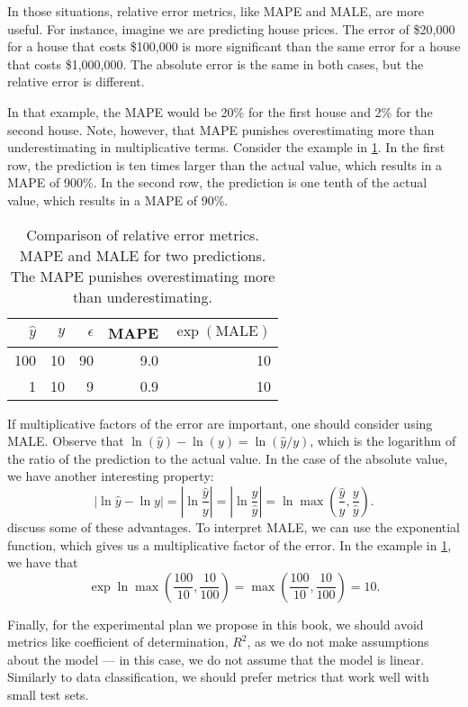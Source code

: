 In those situations, relative error metrics, like MAPE and MALE, are more useful.  For
instance, imagine we are predicting house prices.  The error of \$20,000
for a house that costs \$100,000 is more significant than the same error for a house that
costs \$1,000,000.  The absolute error is the same in both cases, but the relative error
is different.

In that example, the MAPE would be 20\% for the first house and 2\% for the second house.
Note, however, that MAPE punishes overestimating more than underestimating in
multiplicative terms.  Consider the example in \cref{tab:MAPEvsMALE}.  In the first row,
the prediction is ten times larger than the actual value, which results in a MAPE of
900\%.  In the second row, the prediction is one tenth of the actual value, which results
in a MAPE of 90\%.

\begin{table}
  \caption{
    Comparison of relative error metrics.  MAPE and MALE for two predictions.  The MAPE
    punishes overestimating more than underestimating.
  }
  \label{tab:MAPEvsMALE}
  \centering
  \begin{tabular}{r r r r r}
    \toprule
    $\hat{y}$ & $y$ & $\epsilon$ & MAPE & $\exp(\text{MALE})$ \\
    \midrule
    100 & 10 & 90 & 9.0 & 10 \\
      1 & 10 &  9 & 0.9 & 10 \\
    \bottomrule
  \end{tabular}
\end{table}

If multiplicative factors of the error are important, one should consider using MALE.
Observe that $\ln(\hat{y}) - \ln(y) = \ln(\hat{y}/y)$, which is the logarithm of the
ratio of the prediction to the actual value.  In the case of the absolute value, we have
another interesting property: \[
  |\ln\hat{y} - \ln y| =
    |\ln\frac{\hat{y}}{y}| =
    |\ln\frac{y}{\hat{y}}| =
    \ln\max\left(\frac{\hat{y}}{y}, \frac{y}{\hat{y}}\right)\text{.}
\]
\textcite{Tofallis2015} discuss some of these advantages.  To
interpret MALE, we can use the exponential function, which gives us a multiplicative
factor of the error.  In the example in \cref{tab:MAPEvsMALE}, we have that \[
  \exp\ln\max\left(\frac{100}{10}, \frac{10}{100}\right) =
    \max\left(\frac{100}{10}, \frac{10}{100}\right) = 10\text{.}
\]

Finally, for the experimental plan we propose in this book, we should avoid metrics like
coefficient of determination, $R^2$, as we do not make assumptions about the model --- in this
case, we do not assume that the model is linear.  Similarly to data classification, we
should prefer metrics that work well with small test sets.

